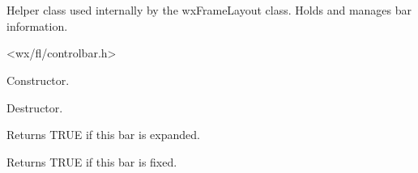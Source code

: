 %
%


\section{}\label{cbbarinfo}


Helper class used internally by the wxFrameLayout class.
Holds and manages bar information.




<wx/fl/controlbar.h>




\label{cbbarinfocbbarinfo}


Constructor.


\label{cbbarinfodtor}


Destructor.


\label{cbbarinfoisexpanded}


Returns TRUE if this bar is expanded.


\label{cbbarinfoisfixed}


Returns TRUE if this bar is fixed.

